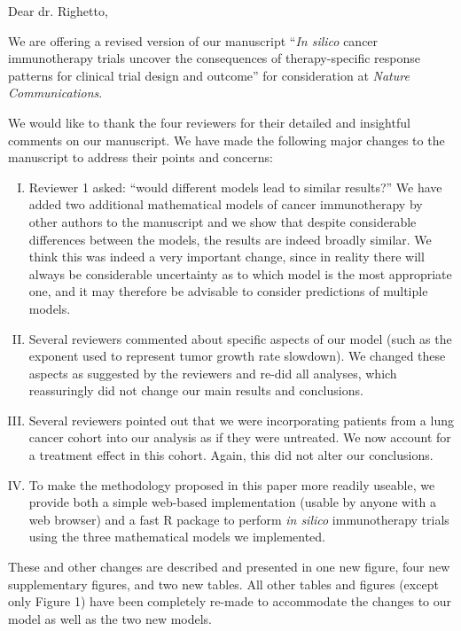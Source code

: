 \documentclass[10pt]{article}
\begin{document}
Dear dr. Righetto, \vspace{10pt}

We are offering a revised version of our manuscript ``\emph{In silico} cancer immunotherapy trials uncover the consequences of therapy-specific response patterns for clinical trial design and outcome'' for consideration at \emph{Nature Communications}.

We would like to thank the four reviewers for their detailed and insightful comments on our manuscript.
We have made the following major changes to the manuscript to address their points and concerns: 

\begin{enumerate}[(I)]

	\item Reviewer 1 asked:  ``would different models lead to similar results?'' We have added 
		two additional mathematical models of cancer immunotherapy
		by other authors to the manuscript and we show that despite
		considerable differences between the models, the results are indeed broadly similar.
		We think this was indeed a very important change, since in reality there will always
		be considerable uncertainty as to which model is the most appropriate one, and it may
		therefore be advisable to consider predictions of multiple models.

	\item Several reviewers commented about specific aspects of our model (such as the exponent
		used to represent tumor growth rate slowdown). We changed these aspects as suggested by
		the reviewers and re-did all analyses, which reassuringly did not change our main 
		results and conclusions. 

	\item Several reviewers pointed out that we were incorporating patients from a lung cancer cohort 
		into our analysis as if they were untreated. We now account for a treatment effect in this
		cohort. Again, this did not alter our conclusions.

	\item To make the methodology proposed in this paper more readily useable, we provide both a simple
		web-based implementation (usable by anyone with a web browser) and a fast R package to perform
		\emph{in silico} immunotherapy trials using the three mathematical models we implemented.

\end{enumerate}

These and other changes are described and presented in one new figure, four new supplementary figures, and two new
tables. All other tables and figures (except only Figure 1) have been completely re-made to accommodate the changes
to our model as well as the two new models. 
\end{document}
